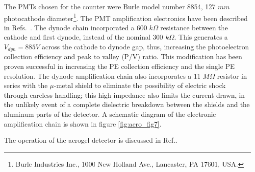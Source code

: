 The PMTs chosen for the counter were Burle model number 8854, 127 $mm$ photocathode 
diameter\footnote{Burle Industries Inc., 1000 New Holland Ave., Lancaster, PA 17601, USA.}.
  The PMT amplification electronics have been described in 
Refs.~\cite{Alexa:1995ne,Lolos:1997vz}.  The dynode chain incorporated a
600 $k\Omega$ resistance between the cathode and first dynode, instead of the
nominal 300 $k\Omega$.  This generates a $V_{dyn}=885 V$ across the cathode to
dynode gap, thus, increasing the photoelectron collection efficiency and peak
to valley (P/V) ratio.  This modification has been proven successful in
increasing the PE collection efficiency and the single PE resolution.  The
dynode amplification chain also incorporates a 11 $M\Omega$ resistor in series
with the $\mu$-metal shield to eliminate the possibility of electric shock
through careless handling; this high impedance also limits the current drawn,
in the unlikely event of a complete dielectric breakdown between the shields
and the aluminum parts of the detector. A schematic diagram of the electronic 
amplification chain is shown in figure \ref{fig:aero_fig7}. 

The operation of the aerogel detector is discussed in Ref.\cite{Brash:2002vn}.



